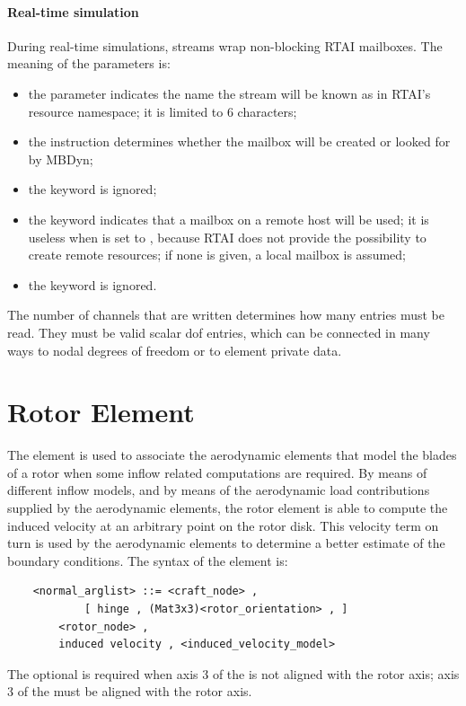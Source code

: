 \paragraph{Real-time simulation}
During real-time simulations, streams wrap non-blocking RTAI mailboxes.
The meaning of the parameters is:
\begin{itemize}
\item the parameter  indicates the name the stream
will be known as in RTAI's resource namespace; it is limited to 6 characters;
\item the instruction  determines whether the mailbox will be
created or looked for by MBDyn;
\item the keyword  is ignored;
\item the keyword  indicates that a mailbox on a remote host 
will be used; it is useless when  is set to , because
RTAI does not provide the possibility to create remote resources;
if none is given, a local mailbox is assumed;
\item the keyword  is ignored.
\end{itemize}

The number of channels  that are written
determines how many  entries must be read.
They must be valid scalar dof entries, which can be connected
in many ways to nodal degrees of freedom or to element private data.






\section{Rotor Element}
The  element is used to associate the aerodynamic elements that
model the blades of a rotor when some inflow related computations are
required. By means of different inflow models, and by means of the
aerodynamic load contributions supplied by the aerodynamic elements, the
rotor element is able to compute the induced velocity at an arbitrary point on
the rotor disk. This velocity term on turn is used by the aerodynamic
elements to determine a better estimate of the boundary conditions.
The syntax of the  element is:
\begin{verbatim}
    <normal_arglist> ::= <craft_node> ,
            [ hinge , (Mat3x3)<rotor_orientation> , ]
        <rotor_node> ,
        induced velocity , <induced_velocity_model>
\end{verbatim}
The optional  is required when axis 3 
of the  is not aligned with the rotor axis; axis 3
of the  must be aligned with the rotor axis.

